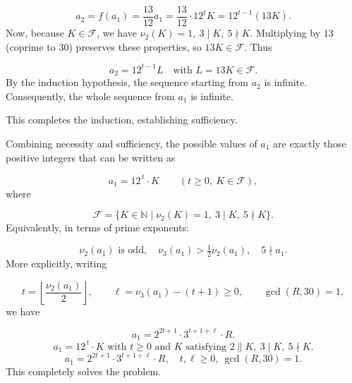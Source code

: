 \[
a_2=f(a_1)=\frac{13}{12}a_1=\frac{13}{12}\cdot12^tK=12^{t-1}(13K).
\]
Now, because \(K\in\mathcal{F}\), we have \(\nu_2(K)=1,\ 3\mid K,\ 5\nmid K\). Multiplying by \(13\) (coprime to \(30\)) preserves these properties, so \(13K\in\mathcal{F}\). Thus\par
\[
a_2=12^{t-1}L\quad\text{with }L=13K\in\mathcal{F}.
\]
By the induction hypothesis, the sequence starting from \(a_2\) is infinite. Consequently, the whole sequence from \(a_1\) is infinite.

This completes the induction, establishing sufficiency.

Combining necessity and sufficiency, the possible values of \(a_1\) are exactly those positive integers that can be written as

\[
a_1 = 12^{\,t} \cdot K \qquad (t\ge0,\ K\in\mathcal{F}),
\]
where\par
\[
\mathcal{F}=\bigl\{K\in\mathbb{N}\;\big|\; \nu_2(K)=1,\ 3\mid K,\ 5\nmid K\bigr\}.
\]
Equivalently, in terms of prime exponents:\par
\[
\nu_2(a_1)\text{ is odd},\quad \nu_3(a_1)>\tfrac12\nu_2(a_1),\quad 5\nmid a_1.
\]
More explicitly, writing\par
\[
t = \left\lfloor\frac{\nu_2(a_1)}{2}\right\rfloor,\qquad \ell = \nu_3(a_1)-(t+1)\ge0,\qquad \gcd(R,30)=1,
\]
we have\par
\[
a_1 = 2^{2t+1}\cdot3^{t+1+\ell}\cdot R.
\]
\[
\boxed{a_1 = 12^{\,t} \cdot K \text{ with } t \ge 0 \text{ and } K \text{ satisfying } 2\parallel K,\ 3\mid K,\ 5\nmid K.}
\]
\[
\boxed{a_1 = 2^{2t+1}\cdot 3^{t+1+\ell}\cdot R,\quad t,\ell\ge0,\ \gcd(R,30)=1.}
\]
This completely solves the problem.\par
\par
